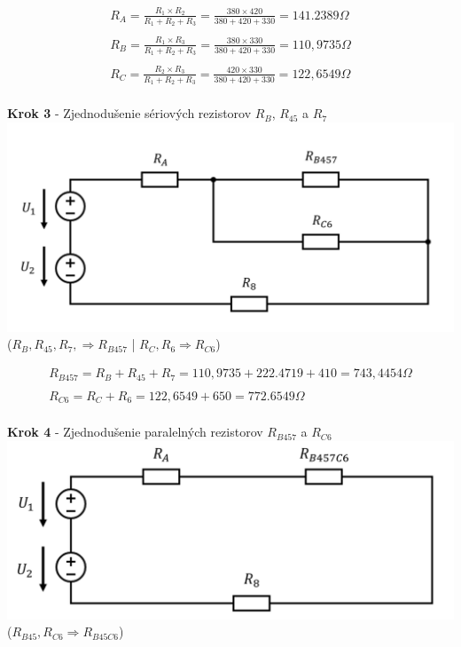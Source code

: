 \begin{gather*}
R_A = \frac{R_1 \times R_2}{R_1 + R_2 + R_3} =
\frac{380 \times 420}{380 + 420 + 330}=
141.2389 \Omega \\\\
R_B = \frac{R_1 \times R_3}{R_1 + R_2 + R_3} =
\frac{380 \times 330}{380 + 420 + 330} =
110,9735 \Omega \\\\
R_C = \frac{R_2 \times R_3}{R_1 + R_2 + R_3} =
\frac{420 \times 330}{380 + 420 + 330} =
122,6549 \Omega \\\
\end{gather*}

\begin{center}
\textbf{Krok 3} - Zjednodušenie sériových rezistorov $R_B$, $R_{45}$ a $R_7$
\includegraphics[scale=0.5,keepaspectratio]{fig/c3.png} \\
($R_B, R_45, R_7, \Rightarrow R_{B457}$ | $R_C, R_6 \Rightarrow R_{C6}$)
\end{center}

\begin{gather*}
R_{B457} = R_B + R_45 + R_7 =
110,9735 + 222.4719 + 410 =
743,4454 \Omega
\\\\
R_{C6} = R_C + R_6 =
122,6549 + 650 =
772.6549 \Omega
\\\
\end{gather*}
 
\newpage

\begin{center}
\textbf{Krok 4} - Zjednodušenie paralelných rezistorov $R_{B457}$ a $R_{C6}$ \\
\includegraphics[scale=0.5,keepaspectratio]{fig/c4.png} \\
($R_{B45}, R_{C6} \Rightarrow R_{B45C6}$)
\end{center}

